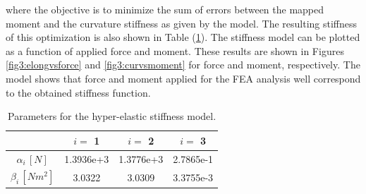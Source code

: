 where the objective is to minimize the sum of errors between the mapped moment and the curvature stiffness as given by the model. The resulting stiffness of this optimization is also shown in Table (\ref{tab3:stiffnessparameters}). The stiffness model can be plotted as a function of applied force and moment. These results are shown in Figures \ref{fig3:elongvsforce} and \ref{fig3:curvsmoment} for force and moment, respectively. The model shows that force and moment applied for the FEA analysis well correspond to the obtained stiffness function. 

\begin{table}[H]
    \centering
        \caption{Parameters for the hyper-elastic stiffness model.}
\begin{tabular}{|c|c|c|c|} \hline
            &  $i = $ 1      &    $i = $    2   &  $i = $ 3  \\ \hline
   $\alpha_i \hspace{2pt}[N]$    &    1.3936e+3    & 1.3776e+3    & 2.7865e-1 \\ \hline
   $\beta_i \hspace{2pt}  [Nm^2] $     &  3.0322 & 3.0309    &  3.3755e-3\\ \hline
\end{tabular}
    \label{tab3:stiffnessparameters}
\end{table}


